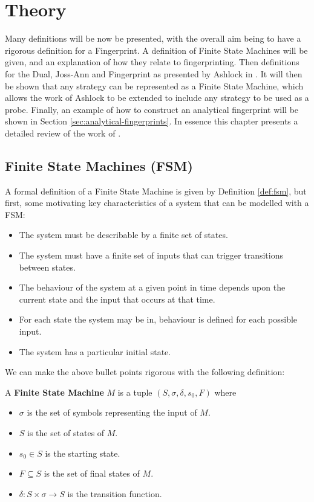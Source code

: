 
\chapter{Theory}\label{cha:theory}

Many definitions will be now be presented, with the overall aim being to have a rigorous definition for a Fingerprint.
A definition of Finite State Machines will be given, and an explanation of how they relate to fingerprinting.
Then definitions for the Dual, Joss-Ann and Fingerprint as presented by Ashlock in \cite{Ashlock2004}.
It will then be shown that any strategy can be represented as a Finite State Machine, which allows the work of Ashlock to be extended to include any strategy to be used as a probe.
Finally, an example of how to construct an analytical fingerprint will be shown in Section \ref{sec:analytical-fingerprints}.
In essence this chapter presents a detailed review of the work of \cite{Ashlock2008, Ashlock2010, Ashlock2004,  Ashlock2005, Ashlock2009, Ashlock2006}.



\section{Finite State Machines (FSM)}\label{sec:fsm}

A formal definition of a Finite State Machine is given by Definition \ref{def:fsm}, but first, some motivating key characteristics of a system that can be modelled with a FSM:

\begin{itemize}
 \item The system must be describable by a finite set of states.
 \item The system must have a finite set of inputs that can trigger transitions between states.
 \item The behaviour of the system at a given point in time depends upon the current state and the input that occurs at that time.
 \item For each state the system may be in, behaviour is defined for each possible input.
 \item The system has a particular initial state.
\end{itemize}

We can make the above bullet points rigorous with the following definition:

\begin{definition}\label{def:fsm}
A \textbf{Finite State Machine} $M$ is a tuple $(S, \sigma, \delta, s_0, F)$ where
\begin{itemize}
 \item $\sigma$ is the set of symbols representing the input of $M$.
 \item $S$ is the set of states of $M$.
 \item $s_0 \in S$ is the starting state.
 \item $F \subseteq S$ is the set of final states of $M$.
 \item $\delta: S \times \sigma \rightarrow S$ is the transition function.
\end{itemize}
\end{definition}

